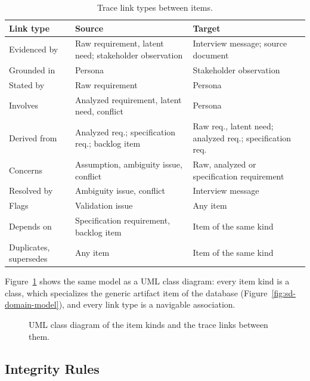 \begin{table}[H]
    \centering
    \caption{Trace link types between items.}
    \label{tab:pa-links}
    \begin{tabularx}{\linewidth}{|l|X|X|}
        \hline
        \textbf{Link type} & \textbf{Source} & \textbf{Target} \\
        \hline
        Evidenced by & Raw requirement, latent need; stakeholder observation & Interview message; source document \\
        Grounded in & Persona & Stakeholder observation \\
        Stated by & Raw requirement & Persona \\
        Involves & Analyzed requirement, latent need, conflict & Persona \\
        Derived from & Analyzed req.; specification req.; backlog item & Raw req., latent need; analyzed req.; specification req. \\
        Concerns & Assumption, ambiguity issue, conflict & Raw, analyzed or specification requirement \\
        Resolved by & Ambiguity issue, conflict & Interview message \\
        Flags & Validation issue & Any item \\
        Depends on & Specification requirement, backlog item & Item of the same kind \\
        Duplicates, supersedes & Any item & Item of the same kind \\
        \hline
    \end{tabularx}
\end{table}

Figure~\ref{fig:pa-trace-model} shows the same model as a UML class diagram: every item kind is a class, which specializes the generic artifact item of the database (Figure~\ref{fig:sd-domain-model}), and every link type is a navigable association.

\begin{figure}[H]
    \centering
    \resizebox{\linewidth}{!}{}
    \caption{UML class diagram of the item kinds and the trace links between them.}
    \label{fig:pa-trace-model}
\end{figure}

\subsection{Integrity Rules}
\label{sec:pa-integrity}

